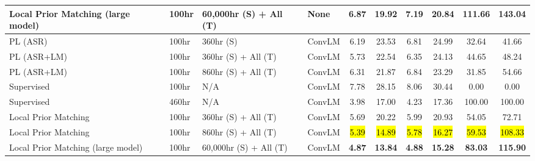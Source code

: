 \begin{table*}[ht]
\begin{center}
{\begin{tabular}{llllcccccc}
Local Prior Matching (large model)  & 100hr & 60,000hr (S) + All (T) & None & \bf{6.87} & \bf{19.92} & \bf{7.19} & \bf{20.84} & \bf{111.66} & \bf{143.04} \\
\midrule
PL (ASR)~\citep{kahn2019self} & 100hr & 360hr (S) & ConvLM & 6.19 & 23.53 & 6.81 & 24.99 & 32.64 & 41.66 \\
PL (ASR+LM)~\citep{kahn2019self}  & 100hr & 360hr (S) + All (T) & ConvLM & 5.73 & 22.54 & 6.35 & 24.13 & 44.65 & 48.24 \\
PL (ASR+LM)~\citep{kahn2019self}  & 100hr & 860hr (S) + All (T) & ConvLM & 6.31 & 21.87 & 6.84 & 23.29 & 31.85 & 54.66 \\
\cmidrule{2-10}
Supervised & 100hr & N/A & ConvLM & 7.78 & 28.15 & 8.06 & 30.44 & 0.00 & 0.00 \\
Supervised & 460hr & N/A & ConvLM & 3.98 & 17.00 & 4.23 & 17.36 & 100.00 & 100.00 \\
Local Prior Matching & 100hr & 360hr (S) + All (T) & ConvLM &  5.69 & 20.22 & 5.99 & 20.93 & 54.05 & 72.71 \\
Local Prior Matching & 100hr & 860hr (S) + All (T) & ConvLM & \hl{5.39} & \hl{14.89} & \hl{5.78} & \hl{16.27} &
\hl{59.53} & \hl{108.33} \\ 
Local Prior Matching (large model)  & 100hr & 60,000hr (S) + All (T) & ConvLM & \bf{4.87} & \bf{13.84} & \bf{4.88} & \bf{15.28} & \bf{83.03} & \bf{115.90} \\
        \bottomrule
    \end{tabular}
    }
    \end{center}
\end{table*}